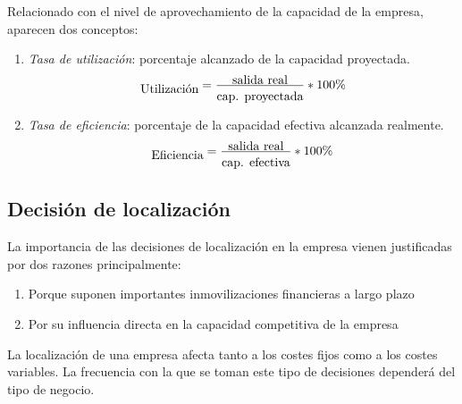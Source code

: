\documentclass[10pt,a4paper,spanish]{report}
\begin{document}
                        Relacionado con el nivel de aprovechamiento de la capacidad de la empresa, aparecen dos conceptos:
                        \begin{enumerate}[---]
                              \item \textit{\textcolor[rgb]{0.9,0.7,0.6}{Tasa de utilización}}: porcentaje alcanzado de la capacidad proyectada.
                              \begin{equation}
                                    \txt{Utilización}=\frac{\txt{salida real}}{\txt{cap. proyectada}}\ast100\%
                              \end{equation}
                              \item \textit{\textcolor[rgb]{0.9,0.7,0.6}{Tasa de eficiencia}}: porcentaje de la capacidad efectiva alcanzada realmente.
                              \begin{equation}
                                    \txt{Eficiencia}=\frac{\txt{salida real}}{\txt{cap. efectiva}}\ast100\%
                              \end{equation}
                        \end{enumerate}

            \subsection{\textcolor[rgb]{0.9,0.7,0.6}Decisión de localización}

                  La importancia de las decisiones de localización en la empresa vienen justificadas por dos razones principalmente:
                  \begin{enumerate}[1.]
                        \item Porque suponen importantes inmovilizaciones financieras a largo plazo
                        \item Por su influencia directa en la capacidad competitiva de la empresa
                  \end{enumerate}

                  La localización de una empresa afecta tanto a los costes fijos como a los costes variables. La frecuencia con la que se toman este tipo de decisiones dependerá del tipo de negocio.
\end{document}
